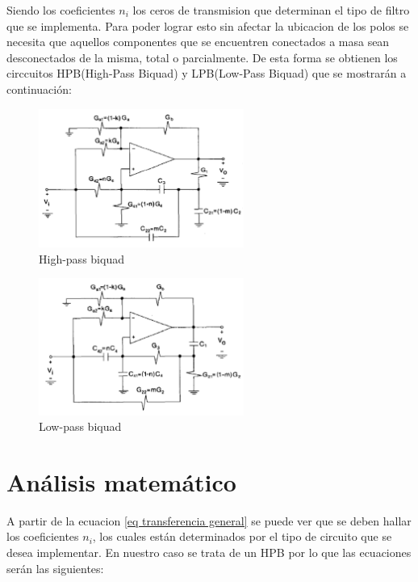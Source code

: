 Siendo los coeficientes $n_i$ los ceros de transmision que determinan el tipo de filtro que se implementa. Para poder lograr esto sin afectar la ubicacion de los polos se necesita que aquellos componentes que se encuentren conectados a masa sean desconectados de la misma, total o parcialmente. De esta forma se obtienen los circcuitos HPB(High-Pass Biquad) y LPB(Low-Pass Biquad) que se mostrarán a continuación:

\begin{figure}[h]
	\includegraphics[width=0.6\textwidth]{../Ejercicio2-DisenoDeCeldas/3CeldaSedra/Imagenes/HP biquad.png}
	\centering
	\caption{High-pass biquad}
	\label{HPB}
\end{figure}

\begin{figure}[h]
	\includegraphics[width=0.6\textwidth]{../Ejercicio2-DisenoDeCeldas/3CeldaSedra/Imagenes/LP biquad.png}
	\centering
	\caption{Low-pass biquad}
	\label{LPB}
\end{figure}

\section{Análisis matemático}

A partir de la ecuacion \ref{eq transferencia general} se puede ver que se deben hallar los coeficientes $n_i$, los cuales están determinados por el tipo de circuito que se desea implementar. En nuestro caso se trata de un HPB por lo que las ecuaciones serán las siguientes:

